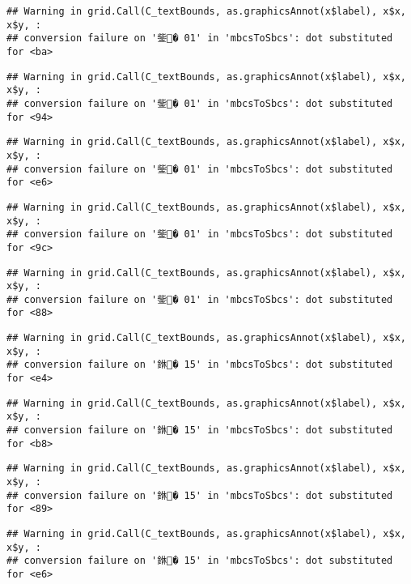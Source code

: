 \documentclass[]{article}
\begin{document}
\begin{verbatim}
## Warning in grid.Call(C_textBounds, as.graphicsAnnot(x$label), x$x, x$y, :
## conversion failure on '鈭� 01' in 'mbcsToSbcs': dot substituted for <ba>
\end{verbatim}

\begin{verbatim}
## Warning in grid.Call(C_textBounds, as.graphicsAnnot(x$label), x$x, x$y, :
## conversion failure on '鈭� 01' in 'mbcsToSbcs': dot substituted for <94>
\end{verbatim}

\begin{verbatim}
## Warning in grid.Call(C_textBounds, as.graphicsAnnot(x$label), x$x, x$y, :
## conversion failure on '鈭� 01' in 'mbcsToSbcs': dot substituted for <e6>
\end{verbatim}

\begin{verbatim}
## Warning in grid.Call(C_textBounds, as.graphicsAnnot(x$label), x$x, x$y, :
## conversion failure on '鈭� 01' in 'mbcsToSbcs': dot substituted for <9c>
\end{verbatim}

\begin{verbatim}
## Warning in grid.Call(C_textBounds, as.graphicsAnnot(x$label), x$x, x$y, :
## conversion failure on '鈭� 01' in 'mbcsToSbcs': dot substituted for <88>
\end{verbatim}

\begin{verbatim}
## Warning in grid.Call(C_textBounds, as.graphicsAnnot(x$label), x$x, x$y, :
## conversion failure on '銝� 15' in 'mbcsToSbcs': dot substituted for <e4>
\end{verbatim}

\begin{verbatim}
## Warning in grid.Call(C_textBounds, as.graphicsAnnot(x$label), x$x, x$y, :
## conversion failure on '銝� 15' in 'mbcsToSbcs': dot substituted for <b8>
\end{verbatim}

\begin{verbatim}
## Warning in grid.Call(C_textBounds, as.graphicsAnnot(x$label), x$x, x$y, :
## conversion failure on '銝� 15' in 'mbcsToSbcs': dot substituted for <89>
\end{verbatim}

\begin{verbatim}
## Warning in grid.Call(C_textBounds, as.graphicsAnnot(x$label), x$x, x$y, :
## conversion failure on '銝� 15' in 'mbcsToSbcs': dot substituted for <e6>
\end{verbatim}
\end{document}
